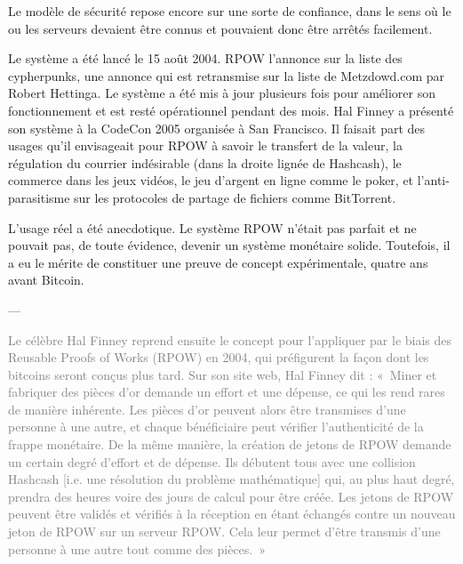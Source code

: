 Le modèle de sécurité repose encore sur une sorte de confiance, dans le sens où le ou les serveurs devaient être connus et pouvaient donc être arrêtés facilement.

%
Le système a été lancé le 15 août 2004. RPOW l'annonce sur la liste des cypherpunks, une annonce qui est retransmise sur la liste de Metzdowd.com par Robert Hettinga. Le système a été mis à jour plusieurs fois pour améliorer son fonctionnement et est resté opérationnel pendant des mois. Hal Finney a présenté son système à la CodeCon 2005 organisée à San Francisco. Il faisait part des usages qu'il envisageait pour RPOW à savoir le transfert de la valeur, la régulation du courrier indésirable (dans la droite lignée de Hashcash), le commerce dans les jeux vidéos, le jeu d'argent en ligne comme le poker, et l'anti-parasitisme sur les protocoles de partage de fichiers comme BitTorrent.

L'usage réel a été anecdotique. Le système RPOW n'était pas parfait et ne pouvait pas, de toute évidence, devenir un système monétaire solide. Toutefois, il a eu le mérite de constituer une preuve de concept expérimentale, quatre ans avant Bitcoin.









---

\textcolor{gray}{Le célèbre Hal Finney reprend ensuite le concept pour l'appliquer par le biais des Reusable Proofs of Works (RPOW) en 2004, qui préfigurent la façon dont les bitcoins seront conçus plus tard. Sur son site web, Hal Finney dit : «~Miner et fabriquer des pièces d'or demande un effort et une dépense, ce qui les rend rares de manière inhérente. Les pièces d'or peuvent alors être transmises d'une personne à une autre, et chaque bénéficiaire peut vérifier l'authenticité de la frappe monétaire. De la même manière, la création de jetons de RPOW demande un certain degré d'effort et de dépense. Ils débutent tous avec une collision Hashcash [i.e. une résolution du problème mathématique] qui, au plus haut degré, prendra des heures voire des jours de calcul pour être créée. Les jetons de RPOW peuvent être validés et vérifiés à la réception en étant échangés contre un nouveau jeton de RPOW sur un serveur RPOW. Cela leur permet d'être transmis d'une personne à une autre tout comme des pièces.~»}

